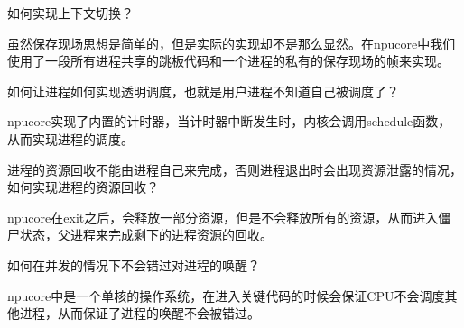 如何实现上下文切换？

虽然保存现场思想是简单的，但是实际的实现却不是那么显然。在npucore中我们使用了一段所有进程共享的跳板代码和一个进程的私有的保存现场的帧来实现。

如何让进程如何实现透明调度，也就是用户进程不知道自己被调度了？

npucore实现了内置的计时器，当计时器中断发生时，内核会调用schedule函数，从而实现进程的调度。

进程的资源回收不能由进程自己来完成，否则进程退出时会出现资源泄露的情况，如何实现进程的资源回收？

npucore在exit之后，会释放一部分资源，但是不会释放所有的资源，从而进入僵尸状态，父进程来完成剩下的进程资源的回收。

如何在并发的情况下不会错过对进程的唤醒？

npucore中是一个单核的操作系统，在进入关键代码的时候会保证CPU不会调度其他进程，从而保证了进程的唤醒不会被错过。